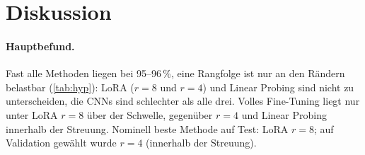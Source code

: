 \section{Diskussion}
\label{sec:discussion}

\paragraph{Hauptbefund.}
Fast alle Methoden liegen bei 95--96\,\%, eine Rangfolge ist nur an den Rändern belastbar
(\cref{tab:hyp}): LoRA ($r=8$ und $r=4$) und Linear Probing sind nicht zu unterscheiden, die CNNs sind
schlechter als alle drei. Volles Fine-Tuning liegt nur unter LoRA $r=8$ über der Schwelle, gegenüber
$r=4$ und Linear Probing innerhalb der Streuung. Nominell beste Methode auf Test: LoRA $r=8$; auf Validation
gewählt wurde $r=4$ (innerhalb der Streuung).

\begin{table}[t]
  \centering
  \caption{Antworten auf Q1--Q4 (Urteil über die Hypothesen). Schwelle: doppelte größere Seed-Standardabweichung (Abschn.~3.2).}
  \label{tab:hyp}
  \small
\end{table}

